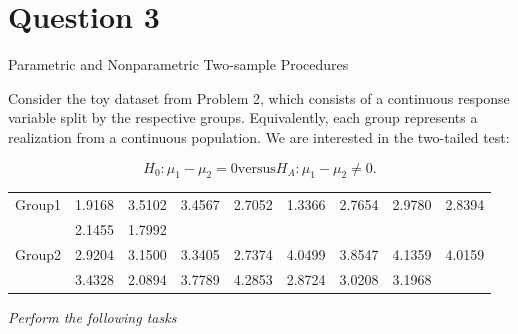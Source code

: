 \documentclass[letterpaper]{article}
\begin{document}
		\clearpage
		
		\section{Question 3}
		
		{\color{deepred} Parametric and Nonparametric Two-sample Procedures}
		
		
		Consider the toy dataset from Problem 2, which consists of a continuous response variable split by the respective groups. Equivalently, each group represents a realization from a continuous population. We are interested in the two-tailed test:
		
		\[
		H_0 : \mu_1 - \mu_2 = 0
		\text{versus} 
		H_A : \mu_1 - \mu_2 \ne 0.
		\]
		
		\begin{center}
			\begin{tabular}{lcccccccc}
				\hline
				Group1 & 1.9168 & 3.5102 & 3.4567 & 2.7052 & 1.3366 & 2.7654 & 2.9780 & 2.8394 \\
				& 2.1455 & 1.7992\\
				\hline
				Group2 & 2.9204 & 3.1500 & 3.3405 & 2.7374 & 4.0499 & 3.8547 & 4.1359 & 4.0159 \\
				& 3.4328 & 2.0894 & 3.7789 & 4.2853 & 2.8724 & 3.0208 & 3.1968
			\end{tabular}
		\end{center}
		
		\medskip
		
		\emph{Perform the following tasks}
		
\end{document}
